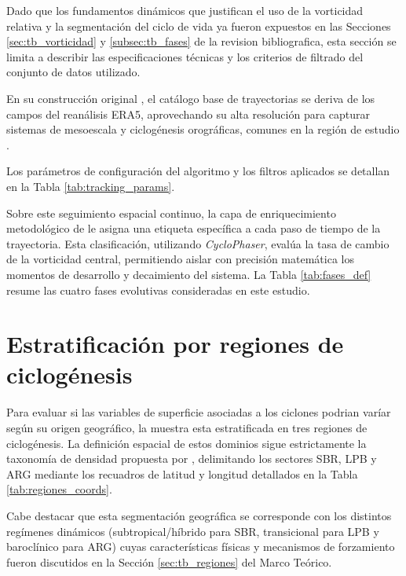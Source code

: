 Dado que los fundamentos dinámicos que justifican el uso de la vorticidad relativa y la segmentación del ciclo de vida ya fueron expuestos en las Secciones \ref{sec:tb_vorticidad} y \ref{subsec:tb_fases} de la revision bibliografica, esta sección se limita a describir las especificaciones técnicas y los criterios de filtrado del conjunto de datos utilizado.

En su construcción original \citep{gramcianinov2019properties}, el catálogo base de trayectorias se deriva de los campos del reanálisis ERA5, aprovechando su alta resolución para capturar sistemas de mesoescala y ciclogénesis orográficas, comunes en la región de estudio \citep{gramcianinov2020analysis}. 

Los parámetros de configuración del algoritmo y los filtros aplicados se detallan en la Tabla \ref{tab:tracking_params}.



Sobre este seguimiento espacial continuo, la capa de enriquecimiento metodológico de \citet{coutodesouza2024new} le asigna una etiqueta específica a cada paso de tiempo de la trayectoria. Esta clasificación, utilizando \textit{CycloPhaser}, evalúa la tasa de cambio de la vorticidad central, permitiendo aislar con precisión matemática los momentos de desarrollo y decaimiento del sistema. La Tabla \ref{tab:fases_def} resume las cuatro fases evolutivas consideradas en este estudio.



\section{Estratificación por regiones de ciclogénesis}\label{sec:regiones_ciclogenesis}

Para evaluar si las variables de superficie asociadas a los ciclones podrian varíar según su origen geográfico, la muestra esta estratificada en tres regiones de ciclogénesis. 
La definición espacial de estos dominios sigue estrictamente la taxonomía de densidad propuesta por \citet{gramcianinov2019properties}, delimitando los sectores SBR, LPB y ARG mediante los recuadros de latitud y longitud detallados en la Tabla \ref{tab:regiones_coords}.



Cabe destacar que esta segmentación geográfica se corresponde con los distintos regímenes dinámicos (subtropical/híbrido para SBR, transicional para LPB y baroclínico para ARG) cuyas características físicas y mecanismos de forzamiento fueron discutidos en la Sección \ref{sec:tb_regiones} del Marco Teórico.

